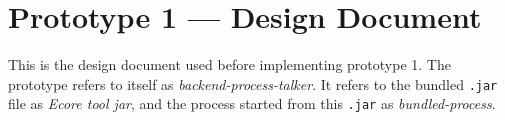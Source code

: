 \chapter{Prototype 1 --- Design Document}\label{app:prototype-1-design-doc}

This is the design document used before implementing prototype 1.
The prototype refers to itself as \emph{backend-process-talker}.
It refers to the bundled \texttt{.jar} file as \emph{Ecore tool jar}, and the process started from this \texttt{.jar} as \emph{bundled-process}.

\cleardoublepage
